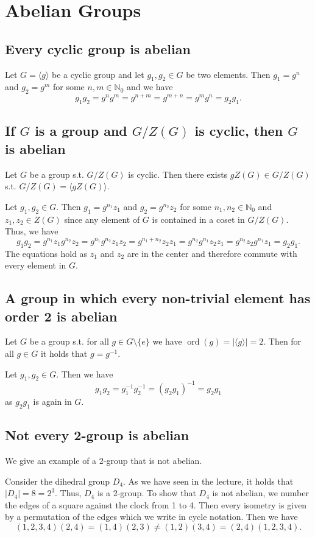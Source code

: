 \section{Abelian Groups}

\subsection{Every cyclic group is abelian}
Let $G = \langle g \rangle$ be a cyclic group and let $g_1, g_2 \in G$ be two elements.
Then $g_1 = g^n$ and $g_2 = g^m$ for some $n, m \in \mathds{N}_0$ and we have
\[ g_1 g_2 = g^n g^m = g^{n+m} = g^{m+n} = g^m g^n = g_2 g_1. \]


\subsection{If $G$ is a group and $G/Z(G)$ is cyclic, then $G$ is abelian}
Let $G$ be a group s.t. $G/Z(G)$ is cyclic. Then there exists $g Z(G) \in G/Z(G)$ s.t. $G/Z(G) = \langle g Z(G) \rangle$.

Let $g_1, g_2 \in G$. Then $g_1 = g^{n_1} z_1$ and $g_2 = g^{n_2} z_2$ for some $n_1, n_2 \in \mathds{N}_0$ and $z_1, z_2 \in Z(G)$ since any element of $G$ is contained in a coset in $G/Z(G)$. Thus, we have
\[ g_1 g_2 = g^{n_1} z_1 g^{n_2} z_2 = g^{n_1} g^{n_2} z_1 z_2 = g^{n_1 + n_2} z_2 z_1 = g^{n_2} g^{n_1} z_2 z_1 = g^{n_2} z_2 g^{n_1} z_1 = g_2 g_1. \]
The equations hold as $z_1$ and $z_2$ are in the center and therefore commute with every element in $G$.


\subsection{A group in which every non-trivial element has order 2 is abelian}
Let $G$ be a group s.t. for all $g \in G \setminus \{e\}$ we have $\operatorname{ord}(g) = |\langle g \rangle| = 2$. Then for all $g \in G$ it holds that $g = g^{-1}$.

Let $g_1, g_2 \in G$. Then we have
\[ g_1 g_2 = g_1^{-1} g_2^{-1} = (g_2 g_1)^{-1} = g_2 g_1 \]
as $g_2 g_1$ is again in $G$.


\subsection{Not every 2-group is abelian}
We give an example of a 2-group that is not abelian.

Consider the dihedral group $D_4$. As we have seen in the lecture, it holds that $|D_4| = 8 = 2^3$. Thus, $D_4$ is a 2-group. To show that $D_4$ is not abelian, we number the edges of a square against the clock from 1 to 4. Then every isometry is given by a permutation of the edges which we write in cycle notation. Then we have
\[ (1,2,3,4) (2,4) = (1,4) (2,3) \neq (1,2) (3,4) = (2,4) (1,2,3,4). \]